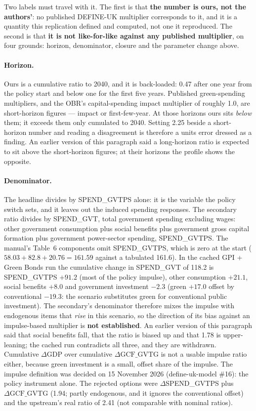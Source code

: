 Two labels must travel with it. The first is that \textbf{the number is ours, not the authors'}: no published DEFINE-UK multiplier corresponds to it, and it is a quantity this replication defined and computed, not one it reproduced. The second is that \textbf{it is not like-for-like against any published multiplier}, on four grounds: horizon, denominator, closure and the parameter change above.

\paragraph{Horizon.} Ours is a cumulative ratio to 2040, and it is back-loaded: 0.47 after one year from the policy start and below one for the first five years. Published green-spending multipliers, and the OBR's capital-spending impact multiplier of roughly 1.0, are short-horizon figures --- impact or first-few-year. At those horizons ours sits \emph{below} them; it exceeds them only cumulated to 2040. Setting 2.25 beside a short-horizon number and reading a disagreement is therefore a units error dressed as a finding. An earlier version of this paragraph said a long-horizon ratio is expected to sit above the short-horizon figures; at their horizons the profile shows the opposite.

\paragraph{Denominator.} The headline divides by SPEND\_GVTPS alone: it is the variable the policy switch sets, and it leaves out the induced spending responses. The secondary ratio divides by SPEND\_GVT, total government spending excluding wages: other government consumption plus social benefits plus government gross capital formation plus government power-sector spending, SPEND\_GVTPS. The manual's Table~6 components omit SPEND\_GVTPS, which is zero at the start ($58.03 + 82.8 + 20.76 = 161.59$ against a tabulated 161.6). In the cached GPI + Green Bonds run the cumulative change in SPEND\_GVT of 118.2 is SPEND\_GVTPS $+91.2$ (most of the policy impulse), other consumption $+21.1$, social benefits $+8.0$ and government investment $-2.3$ (green $+17.0$ offset by conventional $-19.3$: the scenario substitutes green for conventional public investment). The secondary's denominator therefore mixes the impulse with endogenous items that \emph{rise} in this scenario, so the direction of its bias against an impulse-based multiplier is \textbf{not established}. An earlier version of this paragraph said that social benefits fall, that the ratio is biased up and that 1.78 is upper-leaning; the cached run contradicts all three, and they are withdrawn. Cumulative $\Delta$GDP over cumulative $\Delta\mathrm{GCF\_GVTG}$ is not a usable impulse ratio either, because green investment is a small, offset share of the impulse. The impulse definition was decided on 15 November 2026 (define-uk-model \#16): the policy instrument alone. The rejected options were $\Delta$SPEND\_GVTPS plus $\Delta\mathrm{GCF\_GVTG}$ (1.94; partly endogenous, and it ignores the conventional offset) and the upstream's real ratio of 2.41 (not comparable with nominal ratios).

